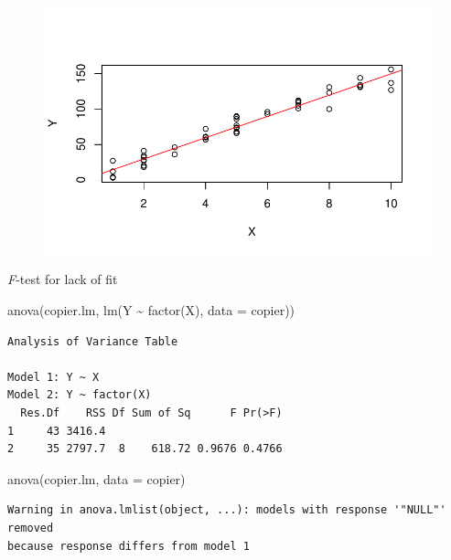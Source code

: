 \documentclass[
  letterpaper,
  DIV=11,
  numbers=noendperiod]{scrartcl}
\newenvironment{Shaded}{\begin{snugshade}}{\end{snugshade}}
\newcommand{\AttributeTok}[1]{\textcolor[rgb]{0.40,0.45,0.13}{#1}}
\newcommand{\FunctionTok}[1]{\textcolor[rgb]{0.28,0.35,0.67}{#1}}
\newcommand{\NormalTok}[1]{\textcolor[rgb]{0.00,0.23,0.31}{#1}}
\newcommand{\SpecialCharTok}[1]{\textcolor[rgb]{0.37,0.37,0.37}{#1}}
\begin{document}
\begin{figure}[H]

{\centering \includegraphics{sta9700_ch3_hw_files/figure-pdf/unnamed-chunk-16-1.pdf}

}

\end{figure}

\emph{F}-test for lack of fit

\begin{Shaded}
\begin{Highlighting}[]
\FunctionTok{anova}\NormalTok{(copier.lm, }\FunctionTok{lm}\NormalTok{(Y }\SpecialCharTok{\textasciitilde{}} \FunctionTok{factor}\NormalTok{(X), }\AttributeTok{data =}\NormalTok{ copier))}
\end{Highlighting}
\end{Shaded}

\begin{verbatim}
Analysis of Variance Table

Model 1: Y ~ X
Model 2: Y ~ factor(X)
  Res.Df    RSS Df Sum of Sq      F Pr(>F)
1     43 3416.4                           
2     35 2797.7  8    618.72 0.9676 0.4766
\end{verbatim}

\begin{Shaded}
\begin{Highlighting}[]
\FunctionTok{anova}\NormalTok{(copier.lm, }\AttributeTok{data =}\NormalTok{ copier)}
\end{Highlighting}
\end{Shaded}

\begin{verbatim}
Warning in anova.lmlist(object, ...): models with response '"NULL"' removed
because response differs from model 1
\end{verbatim}
\end{document}
